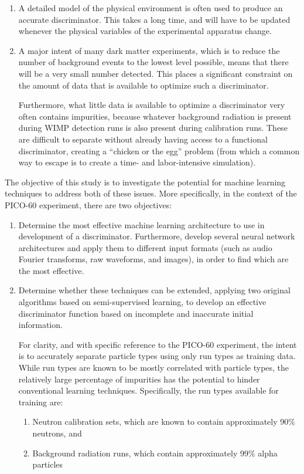 \documentclass[10pt]{article}
\begin{document}
\begin{enumerate}
    \item A detailed model of the physical environment is often used to produce an accurate discriminator. This takes a long time, and will have to be updated whenever the physical variables of the experimental apparatus change.

    \item A major intent of many dark matter experiments, which is to reduce the number of background events to the lowest level possible, means that there will be a very small number detected. This places a significant constraint on the amount of data that is available to optimize such a discriminator.

    Furthermore, what little data is available to optimize a discriminator very often contains impurities, because whatever background radiation is present during WIMP detection runs is also present during calibration runs. These are difficult to separate without already having access to a functional discriminator, creating a ``chicken or the egg'' problem (from which a common way to escape is to create a time- and labor-intensive simulation).
\end{enumerate}

The objective of this study is to investigate the potential for machine learning techniques to address both of these issues. More specifically, in the context of the PICO-60 experiment, there are two objectives:

\begin{enumerate}
    \item Determine the most effective machine learning architecture to use in development of a discriminator. Furthermore, develop several neural network architectures and apply them to different input formats (such as audio Fourier transforms, raw waveforms, and images), in order to find which are the most effective.

    \item Determine whether these techniques can be extended, applying two original algorithms based on semi-supervised learning, to develop an effective discriminator function based on incomplete and inaccurate initial information.
    
    For clarity, and with specific reference to the PICO-60 experiment, the intent is to accurately separate particle types using only run types as training data. While run types are known to be mostly correlated with particle types, the relatively large percentage of impurities has the potential to hinder conventional learning techniques. Specifically, the run types available for training are:

    \begin{enumerate}
        \item Neutron calibration sets, which are known to contain approximately 90\% neutrons, and
        \item Background radiation runs, which contain approximately 99\% alpha particles
    \end{enumerate}
\end{enumerate}
\end{document}
